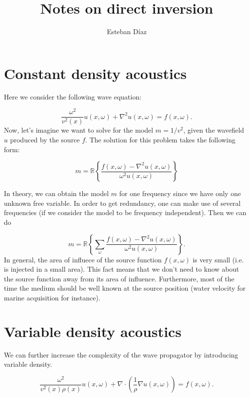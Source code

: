 \documentclass[10pt]{article}
\author{Esteban D\'{i}az}
\title{Notes on direct inversion}{}
\begin{document}
\maketitle


\section{Constant density acoustics}

Here we consider the following wave equation:

\begin{equation}
  \frac{\omega^2 }{v^2(x)} u(x,\omega) +\nabla^2 u(x,\omega) = f(x,\omega).
  \label{eq:cden}
\end{equation}
 Now, let's imagine we want to solve for the model $m = 1/v^2$, given the wavefield $u$ produced
by the source $f$. The solution for this problem takes the following form:

\begin{equation}
   m = \mathbb{R}\left\{ \frac {{f(x,\omega)} - \nabla^2{ u(x,\omega) }}{\omega^2 u(x,\omega)} \right\}
\end{equation}

In theory, we can obtain the model $m$ for one frequency since we have only one unknown free variable.
In order to get redundancy, one can make use of several frequencies (if we consider the model
to be frequency independent). Then we can do

\begin{equation}
   m =  \mathbb{R}\left\{\sum_\omega \frac {{f(x,\omega)} - \nabla^2{ u(x,\omega) }}{\omega^2 u(x,\omega)} \right\}.
\end{equation}
In general, the area of influece of the source function $f(x,\omega)$ is very small (i.e. is injected in a small area). 
 This fact means that we don't need to know about the source function away from its area of influence. Furthermore,
 most of the time the medium should be well known at the source position (water velocity for marine acquisition for instance). 


\section{Variable density acoustics}

We can further increase the complexity of the wave propagator by introducing variable density. 

\begin{equation}
  \frac{\omega^2 }{v^2(x) \rho(x)} u(x,\omega) +\nabla \cdot(\frac{1}{\rho} \nabla u(x,\omega)) = f(x,\omega).
  \label{eq:vden}
\end{equation}
\end{document}
